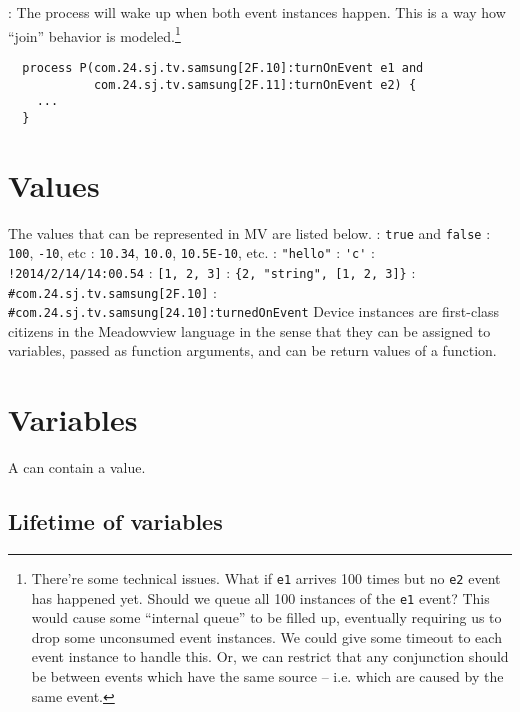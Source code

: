 \documentclass{myproc}
\begin{document}
\w {}: The process will wake up when both event
instances happen. This is a way how ``join'' behavior is
modeled.\footnote{There're some technical issues. What if {\tt{}e1} arrives
  100 times but no {\tt{}e2} event has happened yet. Should we queue all
  100 instances of the {\tt e1} event? This would cause some ``internal
  queue'' to be filled up, eventually requiring us to drop some unconsumed
  event instances.  We could give some timeout to each event instance to
  handle this. 
  Or, we can restrict that any conjunction should be between
  events which have the same source -- i.e. which are caused by the same
  event. } 
  \begin{verbatim}
  process P(com.24.sj.tv.samsung[2F.10]:turnOnEvent e1 and
            com.24.sj.tv.samsung[2F.11]:turnOnEvent e2) {
    ...
  }
  \end{verbatim}
\eit

\section{Values}
The values that can be represented in MV are listed below.
\bit
\w {}: \verb+true+ and \verb+false+
\w {}: \verb+100+, \verb+-10+, etc
\w {}: \verb+10.34+, \verb+10.0+, \verb+10.5E-10+, etc.
\w {}: \verb+"hello"+
\w {}: \verb+'c'+
\w {}: \verb+!2014/2/14/14:00.54+
\w {}: \verb+[1, 2, 3]+
\w {}: \verb+{2, "string", [1, 2, 3]}+
\w {}: \verb+#com.24.sj.tv.samsung[2F.10]+
\w {}: \verb+#com.24.sj.tv.samsung[24.10]:turnedOnEvent+
 Device instances are first-class citizens in the Meadowview language in the
  sense that they can be assigned to variables, passed as function arguments,
  and can be return values of a function.
\eit

\section{Variables}
A  can contain a value.

\subsection{Lifetime of variables}
\end{document}
